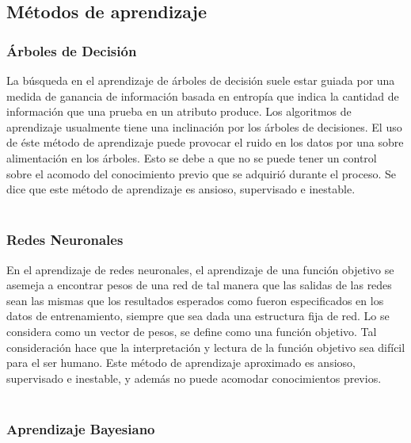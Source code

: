 \subsection{Métodos de aprendizaje}


	\subsubsection{Árboles de Decisión}

	La búsqueda en el aprendizaje de árboles de decisión suele estar guiada por una medida de ganancia de información basada en entropía que indica la cantidad de información que una prueba en un atributo produce. Los algoritmos de aprendizaje usualmente tiene una inclinación por los árboles de decisiones. El uso de éste método de aprendizaje puede provocar el ruido en los datos por una sobre alimentación en los árboles. Esto se debe a que no se puede tener un control sobre el acomodo del conocimiento previo que se adquirió durante el proceso. Se dice que este método de aprendizaje es ansioso, supervisado e inestable.\\ \\
	

	\subsubsection{Redes Neuronales}

	En el aprendizaje de redes neuronales, el aprendizaje de una función objetivo se asemeja a encontrar pesos de una red de tal manera que las salidas de las redes sean las mismas que los resultados esperados como fueron especificados en los datos de entrenamiento, siempre que sea dada una estructura fija de red. Lo se considera como un vector de pesos, se define como una función objetivo. Tal consideración hace que la interpretación y lectura de la función objetivo sea difícil para el ser humano. Este método de aprendizaje aproximado es ansioso, supervisado e inestable, y además no puede acomodar conocimientos previos.\\ \\
	

	\subsubsection{Aprendizaje Bayesiano}

